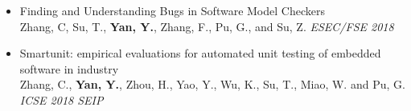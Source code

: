\begin{itemize}[parsep=0.25ex]
  \item{Finding and Understanding Bugs in Software Model Checkers\\
  Zhang, C, Su, T., \textbf{Yan, Y.}, Zhang, F., Pu, G., and Su, Z. \textsl{ESEC/FSE 2018}
  }
  \item{Smartunit: empirical evaluations for automated unit testing of embedded software in industry\\
  Zhang, C., \textbf{Yan, Y.}, Zhou, H., Yao, Y., Wu, K., Su, T., Miao, W. and Pu, G. \textsl{ICSE 2018 SEIP}
  }
\end{itemize}